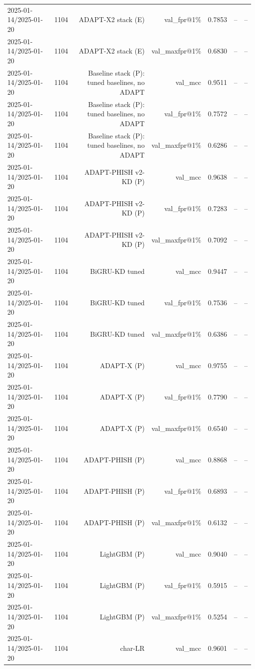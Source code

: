 \begin{table}[t]
\begin{tabular}{llrrrrr}
2025-01-14/2025-01-20 & 1104 & ADAPT-X2 stack (E) & val\_fpr@1\% & 0.7853 & -- & -- \\
2025-01-14/2025-01-20 & 1104 & ADAPT-X2 stack (E) & val\_maxfpr@1\% & 0.6830 & -- & -- \\
2025-01-14/2025-01-20 & 1104 & Baseline stack (P): tuned baselines, no ADAPT & val\_mcc & 0.9511 & -- & -- \\
2025-01-14/2025-01-20 & 1104 & Baseline stack (P): tuned baselines, no ADAPT & val\_fpr@1\% & 0.7572 & -- & -- \\
2025-01-14/2025-01-20 & 1104 & Baseline stack (P): tuned baselines, no ADAPT & val\_maxfpr@1\% & 0.6286 & -- & -- \\
2025-01-14/2025-01-20 & 1104 & ADAPT-PHISH v2-KD (P) & val\_mcc & 0.9638 & -- & -- \\
2025-01-14/2025-01-20 & 1104 & ADAPT-PHISH v2-KD (P) & val\_fpr@1\% & 0.7283 & -- & -- \\
2025-01-14/2025-01-20 & 1104 & ADAPT-PHISH v2-KD (P) & val\_maxfpr@1\% & 0.7092 & -- & -- \\
2025-01-14/2025-01-20 & 1104 & BiGRU-KD tuned & val\_mcc & 0.9447 & -- & -- \\
2025-01-14/2025-01-20 & 1104 & BiGRU-KD tuned & val\_fpr@1\% & 0.7536 & -- & -- \\
2025-01-14/2025-01-20 & 1104 & BiGRU-KD tuned & val\_maxfpr@1\% & 0.6386 & -- & -- \\
2025-01-14/2025-01-20 & 1104 & ADAPT-X (P) & val\_mcc & 0.9755 & -- & -- \\
2025-01-14/2025-01-20 & 1104 & ADAPT-X (P) & val\_fpr@1\% & 0.7790 & -- & -- \\
2025-01-14/2025-01-20 & 1104 & ADAPT-X (P) & val\_maxfpr@1\% & 0.6540 & -- & -- \\
2025-01-14/2025-01-20 & 1104 & ADAPT-PHISH (P) & val\_mcc & 0.8868 & -- & -- \\
2025-01-14/2025-01-20 & 1104 & ADAPT-PHISH (P) & val\_fpr@1\% & 0.6893 & -- & -- \\
2025-01-14/2025-01-20 & 1104 & ADAPT-PHISH (P) & val\_maxfpr@1\% & 0.6132 & -- & -- \\
2025-01-14/2025-01-20 & 1104 & LightGBM (P) & val\_mcc & 0.9040 & -- & -- \\
2025-01-14/2025-01-20 & 1104 & LightGBM (P) & val\_fpr@1\% & 0.5915 & -- & -- \\
2025-01-14/2025-01-20 & 1104 & LightGBM (P) & val\_maxfpr@1\% & 0.5254 & -- & -- \\
2025-01-14/2025-01-20 & 1104 & char-LR & val\_mcc & 0.9601 & -- & -- \\

\end{tabular}
\end{table}
